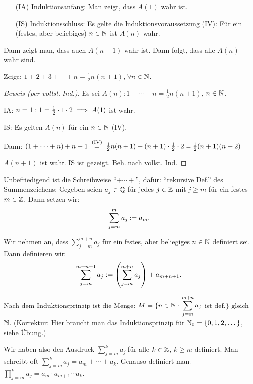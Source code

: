 \documentclass[12pt]{scrreprt}
\begin{document}
\begin{enumerate}
\item[(IA)] Induktionsanfang: Man zeigt, dass $A(1)$ wahr ist.
\item[(IS)] Induktionsschluss: Es gelte die Induktionsvoraussetzung (IV): Für ein (festes, aber beliebiges) $n\in\mathbb{N}$ ist $A(n)$ wahr.
\end{enumerate}

\noindent Dann zeigt man, dass auch $A(n+1)$ wahr ist.
Dann folgt, dass alle $A(n)$ wahr sind.

\begin{bsp}\label{bsp:vor.gauss}
Zeige: $1 + 2 + 3 + \dotsb + n = \frac{1}{2}n(n+1)$, $\forall n\in\mathbb{N}$.
\begin{proof}[Beweis (per vollst. Ind.)]
Es sei $A(n): 1 + \dotsb + n = \frac{1}{2}n(n+1)$, $n\in\mathbb{N}$.

\noindent IA: $n = 1: 1 = \frac{1}{2}\cdot 1 \cdot 2 \implies A(1)$ ist wahr.

\noindent IS: Es gelten $A(n)$ für ein $n\in\mathbb{N}$ (IV).

\noindent Dann: $(1+ \dotsb + n) + n+1 \nach{=}{(IV)} \frac{1}{2}n(n+1) + (n+1)\cdot\frac{1}{2}\cdot 2 = \frac{1}{2}(n+1)(n+2)$

\noindent \folgt $A(n+1)$ ist wahr. \folgt IS ist gezeigt. \folgt Beh. nach vollst. Ind. 
\end{proof}

\noindent Unbefriedigend ist die Schreibweise "`$+\dotsb +$"', dafür: "`rekursive Def."' des Summenzeichens:
Gegeben seien $a_j\in\mathbb{Q}$ für jedes $j\in\mathbb{Z}$ mit $j \geq m$ für ein festes $m\in\mathbb{Z}$. Dann setzen wir:
\[\sum_{j=m}^m a_j := a_m.\]

\noindent Wir nehmen an, dass $\displaystyle \sum_{j=m}^{m+n} a_j$ für ein festes, aber beliegiges $n\in\mathbb{N}$ definiert sei.
Dann definieren wir:
\[\sum_{j=m}^{m+n+1} a_j := \left( \sum_{j=m}^{m+n} a_j\right) + a_{m+n+1}.\]

\noindent Nach dem Induktionsprinzip ist die Menge: $\displaystyle M = \{n\in\mathbb{N}: \sum_{j=m}^{m+n} a_j$ ist def.$\}$ gleich $\mathbb{N}$. (Korrektur: Hier braucht man das Induktionsprinzip für $\mathbb{N}_0 = \{0, 1, 2, \dotsc\}$, siehe Übung.)

Wir haben also den Ausdruck $\displaystyle \sum_{j=m}^k a_j$ für alle $k\in\mathbb{Z}$, $k \geq m$ definiert.
Man schreibt oft $\displaystyle \sum_{j=m}^k a_j = a_m + \dotsb + a_k$.
Genauso definiert man: $\displaystyle \prod_{j=m}^k a_j = a_m \cdot a_{m+1}\dotsm  a_k$.


\end{bsp}
\end{document}
